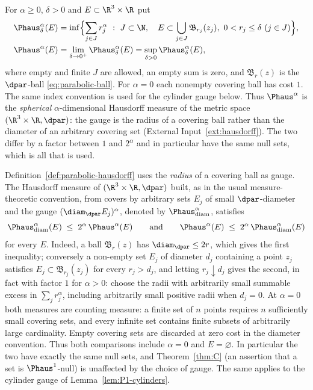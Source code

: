 \documentclass[11pt,reqno]{amsart}
\begin{document}
\begin{definition}\label{def:parabolic-hausdorff}
For $\alpha\ge0$, $\delta>0$ and $E\subset\R^{3}\times\R$ put
\[
\begin{aligned}
  &\Phaus^{\alpha}_{\delta}(E)
  =\inf\Bigl\{\sum_{j\in J}r_{j}^{\alpha}\ :\
     J\subset\N,\quad
     E\subset\bigcup_{j\in J}\mathfrak{B}_{r_{j}}(z_{j}),\
     0<r_{j}\le\delta\ (j\in J)\Bigr\},\\
  &\Phaus^{\alpha}(E)=\lim_{\delta\to0^{+}}\Phaus^{\alpha}_{\delta}(E)
  =\sup_{\delta>0}\Phaus^{\alpha}_{\delta}(E),
\end{aligned}
\]
where empty and finite $J$ are allowed, an empty sum is zero, and
$\mathfrak{B}_{r}(z)$ is the $\dpar$-ball \eqref{eq:parabolic-ball}.
For $\alpha=0$ each nonempty covering ball has cost $1$.
The same index convention is used for the cylinder gauge below. Thus $\Phaus^{\alpha}$ is the \emph{spherical} $\alpha$-dimensional Hausdorff
measure of the metric space $(\R^{3}\times\R,\dpar)$: the gauge is the radius of
a covering ball rather than the diameter of an arbitrary covering set
(External Input~\ref{ext:hausdorff}). The two differ by a factor between $1$ and
$2^{\alpha}$ and in particular have the same null sets, which is all that is
used.
\end{definition}

\begin{remark}\label{rem:hausdorff-gauge}
Definition~\ref{def:parabolic-hausdorff} uses the \emph{radius} of a covering
ball as gauge. The Hausdorff measure of $(\R^{3}\times\R,\dpar)$ built, as in
the usual measure-theoretic convention, from covers by arbitrary sets $E_{j}$ of
small $\dpar$-diameter and the gauge $(\diam_{\dpar}E_{j})^{\alpha}$, denoted by
$\Phaus^{\alpha}_{\mathrm{diam}}$, satisfies
\begin{equation}\label{eq:gauge-comparison}
  \Phaus^{\alpha}_{\mathrm{diam}}(E)\;\le\;2^{\alpha}\,\Phaus^{\alpha}(E)
  \qquad\text{and}\qquad
  \Phaus^{\alpha}(E)\;\le\;2^{\alpha}\,\Phaus^{\alpha}_{\mathrm{diam}}(E)
\end{equation}
for every $E$. Indeed, a ball $\mathfrak{B}_{r}(z)$ has
$\diam_{\dpar}\le2r$, which gives the first inequality; conversely a non-empty set $E_{j}$
of diameter $d_{j}$ containing a point $z_{j}$ satisfies
$E_{j}\subset\mathfrak{B}_{r_{j}}(z_{j})$ for every $r_{j}>d_{j}$, and letting
$r_{j}\downarrow d_{j}$ gives the second, in fact with factor $1$ for
$\alpha>0$: choose the radii with arbitrarily small summable excess in
$\sum_j r_j^\alpha$, including arbitrarily small positive radii when $d_j=0$. At $\alpha=0$ both
measures are counting measure: a finite set of $n$ points requires $n$
sufficiently small covering sets, and every infinite set contains finite
subsets of arbitrarily large cardinality. Empty covering sets are discarded
at zero cost in the diameter convention. Thus both comparisons include
$\alpha=0$ and $E=\varnothing$. In particular the two have exactly the
same null sets, and Theorem~\ref{thm:C} (an assertion that a set is
$\Phaus^{1}$-null) is unaffected by the choice of gauge. The same applies to
the cylinder gauge of Lemma~\ref{lem:P1-cylinders}.
\end{remark}
\end{document}
